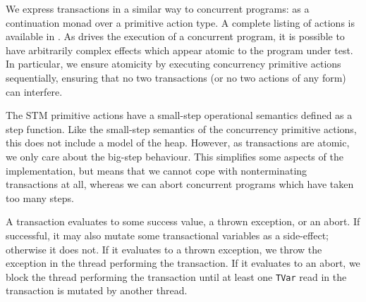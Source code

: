 We express transactions in a similar way to concurrent programs: as a
continuation monad over a primitive action type.  A complete listing of actions
is available in .  As \dejafu{} drives the execution of a
concurrent program, it is possible to have arbitrarily complex effects which
appear atomic to the program under test.  In particular, we ensure atomicity by
executing concurrency primitive actions sequentially, ensuring that no two
transactions (or no two actions of any form) can interfere.

The STM primitive actions have a small-step operational semantics defined as a
step function.  Like the small-step semantics of the concurrency primitive
actions, this does not include a model of the heap.  However, as transactions
are atomic, we only care about the big-step behaviour.  This simplifies some
aspects of the implementation, but means that we cannot cope with nonterminating
transactions at all, whereas we can abort concurrent programs which have taken
too many steps.

A transaction evaluates to some success value, a thrown exception, or an abort.
If successful, it may also mutate some transactional variables as a side-effect;
otherwise it does not.  If it evaluates to a thrown exception, we throw the
exception in the thread performing the transaction.  If it evaluates to an
abort, we block the thread performing the transaction until at least one
\verb|TVar| read in the transaction is mutated by another thread.

